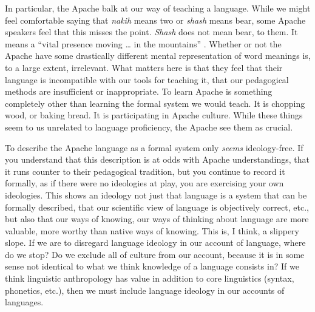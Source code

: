 \documentclass[man,12pt,natbib]{apa6}
\begin{document}
In particular, the Apache balk at our way of teaching a language. While we
might feel comfortable saying that \emph{nakih} means two or \emph{shash} means
bear, some Apache speakers feel that this misses the point. \emph{Shash} does
not mean bear, to them. It means a ``vital presence moving \dots{} in the
mountains'' \citep[p.~283]{Nevins04}. Whether or not the Apache have some
drastically different mental representation of word meanings is, to a large
extent, irrelevant. What matters here is that they feel that their language is
incompatible with our tools for teaching it, that our pedagogical methods are
insufficient or inappropriate. To learn Apache is something completely other
than learning the formal system we would teach. It is chopping wood, or baking
bread. It is participating in Apache culture. While these things seem to us
unrelated to language proficiency, the Apache see them as crucial.

To describe the Apache language as a formal system only \emph{seems}
ideology-free. If you understand that this description is at odds with Apache
understandings, that it runs counter to their pedagogical tradition, but you
continue to record it formally, as if there were no ideologies at play, you are
exercising your own ideologies. This shows an ideology not just that language
is a system that can be formally described, that our scientific view of
language is objectively correct, etc., but also that our ways of knowing, our
ways of thinking about language are more valuable, more worthy than native ways
of knowing. This is, I think, a slippery slope. If we are to disregard language 
ideology in our account of language, where do we stop? Do we exclude all of
culture from our account, because it is in some sense not identical to what we
think knowledge of a language consists in? If we think linguistic anthropology
has value in addition to core linguistics (syntax, phonetics, etc.), then we
must include language ideology in our accounts of languages.

\clearpage

\end{document}

